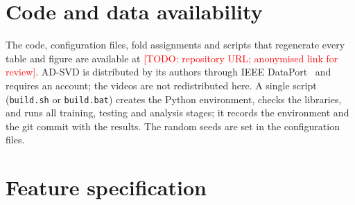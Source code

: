 \documentclass[runningheads]{llncs}
\newcommand{\todo}[1]{\textcolor{red}{[TODO: #1]}}
\begin{document}
\section*{Code and data availability}
The code, configuration files, fold assignments and scripts that regenerate every table and figure are available at
\todo{repository URL; anonymised link for review}. AD-SVD is distributed by its authors through IEEE
DataPort~\cite{akyk-7b78-20} and requires an account; the videos are not redistributed here. A single script (\texttt{build.sh} or \texttt{build.bat}) creates the Python environment, checks the libraries, and runs all training, testing and analysis stages; it records the environment and the git commit with the results. The random seeds are set in the configuration files.

\appendix
\section{Feature specification}
\label{app:features}




\end{document}
